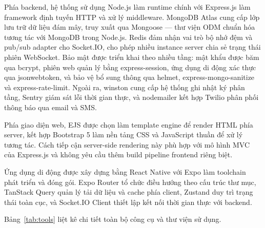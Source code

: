 \documentclass[../DoAn.tex]{subfiles}
\begin{document}
Phía backend, hệ thống sử dụng Node.js làm runtime chính với Express.js làm
framework định tuyến HTTP và xử lý middleware. MongoDB Atlas cung cấp lớp lưu
trữ dữ liệu đám mây, truy xuất qua Mongoose --- thư viện ODM chuẩn hóa tương
tác với MongoDB trong Node.js. Redis đảm nhận vai trò bộ nhớ đệm và pub/sub
adapter cho Socket.IO, cho phép nhiều instance server chia sẻ trạng thái phiên
WebSocket. Bảo mật được triển khai theo nhiều tầng: mật khẩu được băm qua
bcrypt, phiên web quản lý bằng express-session, ứng dụng di động xác thực qua
jsonwebtoken, và bảo vệ bổ sung thông qua helmet, express-mongo-sanitize và
express-rate-limit. Ngoài ra, winston cung cấp hệ thống ghi nhật ký phân tầng,
Sentry giám sát lỗi thời gian thực, và nodemailer kết hợp Twilio phân phối
thông báo qua email và SMS.

Phía giao diện web, EJS được chọn làm template engine để render HTML phía server,
kết hợp Bootstrap 5 làm nền tảng CSS và JavaScript thuần để xử lý tương tác.
Cách tiếp cận server-side rendering này phù hợp với mô hình MVC của Express.js
và không yêu cầu thêm build pipeline frontend riêng biệt.

Ứng dụng di động được xây dựng bằng React Native với Expo làm toolchain phát
triển và đóng gói. Expo Router tổ chức điều hướng theo cấu trúc thư mục, TanStack
Query quản lý tải dữ liệu và cache phía client, Zustand duy trì trạng thái toàn
cục, và Socket.IO Client thiết lập kết nối thời gian thực với backend.

Bảng~\ref{tab:tools} liệt kê chi tiết toàn bộ công cụ và thư viện sử dụng.
\end{document}
